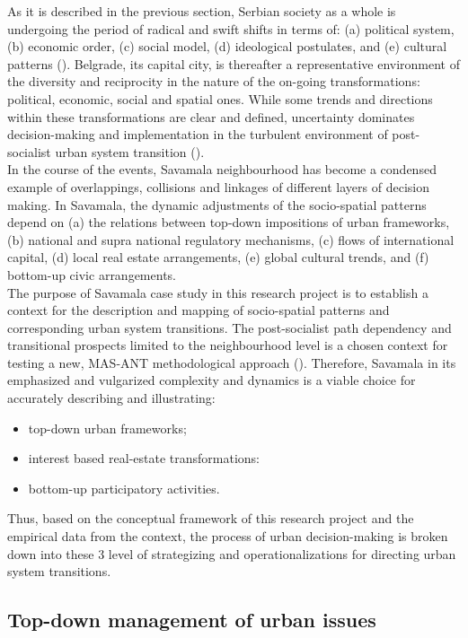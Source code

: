 \documentclass[11pt]{report}
\begin{document}
As it is described in the previous section, Serbian society as a whole is undergoing the period of radical and swift shifts in terms of: (a) political system,
(b) economic order,
(c) social model,
(d) ideological postulates, and
(e) cultural patterns (\href{ref}{\citealt{petrovic_cities_2009}}).
Belgrade, its capital city, is thereafter a representative environment of the diversity and reciprocity in the nature of the on-going transformations: political, economic, social and spatial ones.
While some trends and directions within these transformations are clear and defined, uncertainty dominates decision-making and implementation in the turbulent environment of post-socialist urban system transition (\cite{(Nedovic-Budic, 2001)}).
\\
In the course of the events, Savamala neighbourhood has become a condensed example of overlappings, collisions and linkages of different layers of decision making.
In Savamala, the dynamic adjustments of the socio-spatial patterns depend on
(a) the relations between top-down impositions of urban frameworks, (b) national and supra national regulatory mechanisms,
(c) flows of international capital,
(d) local real estate arrangements,
(e) global cultural trends, and
(f) bottom-up civic arrangements.
\\
The purpose of Savamala case study in this research project is to establish a context for the description and mapping of socio-spatial patterns and corresponding urban system transitions.
The post-socialist path dependency and transitional prospects limited to the neighbourhood level is a chosen context for testing a new, MAS-ANT methodological approach (\cite{Yin, 2009}).
Therefore, Savamala in its emphasized and vulgarized complexity and dynamics is a viable choice for accurately describing and illustrating:
\begin{itemize}
\item top-down urban frameworks;
\item interest based real-estate transformations:
\item bottom-up participatory activities.
\end{itemize}

Thus, based on the conceptual framework of this research project and the empirical data from the context, the process of urban decision-making is broken down into these 3 level of strategizing and operationalizations for directing urban system transitions. 

\subsection{Top-down management of urban issues}
\end{document}
